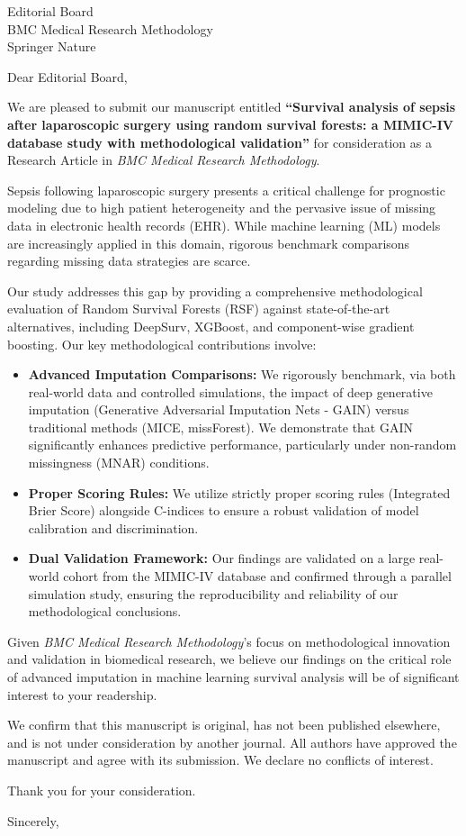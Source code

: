 \documentclass[11pt]{letter}
\begin{document}
\begin{letter}{Editorial Board\\
BMC Medical Research Methodology\\
Springer Nature}

\opening{Dear Editorial Board,}

We are pleased to submit our manuscript entitled \textbf{``Survival analysis of sepsis after laparoscopic surgery using random survival forests: a MIMIC-IV database study with methodological validation''} for consideration as a Research Article in \textit{BMC Medical Research Methodology}.

Sepsis following laparoscopic surgery presents a critical challenge for prognostic modeling due to high patient heterogeneity and the pervasive issue of missing data in electronic health records (EHR). While machine learning (ML) models are increasingly applied in this domain, rigorous benchmark comparisons regarding missing data strategies are scarce.

Our study addresses this gap by providing a comprehensive methodological evaluation of Random Survival Forests (RSF) against state-of-the-art alternatives, including DeepSurv, XGBoost, and component-wise gradient boosting. Our key methodological contributions involve:
\begin{itemize}
    \item \textbf{Advanced Imputation Comparisons:} We rigorously benchmark, via both real-world data and controlled simulations, the impact of deep generative imputation (Generative Adversarial Imputation Nets - GAIN) versus traditional methods (MICE, missForest). We demonstrate that GAIN significantly enhances predictive performance, particularly under non-random missingness (MNAR) conditions.
    \item \textbf{Proper Scoring Rules:} We utilize strictly proper scoring rules (Integrated Brier Score) alongside C-indices to ensure a robust validation of model calibration and discrimination.
    \item \textbf{Dual Validation Framework:} Our findings are validated on a large real-world cohort from the MIMIC-IV database and confirmed through a parallel simulation study, ensuring the reproducibility and reliability of our methodological conclusions.
\end{itemize}

Given \textit{BMC Medical Research Methodology}'s focus on methodological innovation and validation in biomedical research, we believe our findings on the critical role of advanced imputation in machine learning survival analysis will be of significant interest to your readership.

We confirm that this manuscript is original, has not been published elsewhere, and is not under consideration by another journal. All authors have approved the manuscript and agree with its submission. We declare no conflicts of interest.

Thank you for your consideration.

\closing{Sincerely,}

\end{letter}
\end{document}
